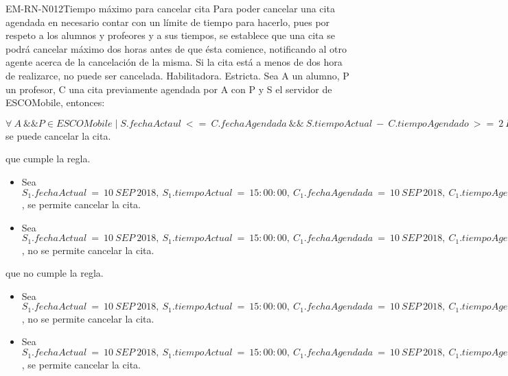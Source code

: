 \begin{BussinesRule}{EM-RN-N012}{Tiempo máximo para cancelar cita}
	\BRitem[Descripción:] Para poder cancelar una cita agendada en necesario contar con un límite de tiempo para hacerlo, pues por respeto a los alumnos y profeores y a sus tiempos, se establece que una cita se podrá cancelar máximo dos horas antes de que ésta comience, notificando al otro agente acerca de la cancelación de la misma. Si la cita está a menos de dos hora de realizarce, no puede ser cancelada.
	\BRitem[Tipo: ] Habilitadora.
	\BRitem[Nivel: ] Estricta.
	\BRitem[Sentenia: ] Sea A un alumno, P un profesor, C una cita previamente agendada por A con P y S el servidor de ESCOMobile, entonces:
	\begin{center}
		$\forall \: A \: \&\& P \in ESCOMobile \mid  S.fechaActaul \: <= \: C.fechaAgendada \: \&\& \: S.tiempoActual \: - \: C.tiempoAgendado \: >= \: 2 \: Horas \: \Rightarrow$ se puede cancelar la cita.
	\end{center}
	 que cumple la regla.
		\begin{itemize}
			\item Sea $S_{1}.fechaActual \: = \: 10 \: SEP \: 2018, \: S_{1}.tiempoActual \: = \: 15:00:00, \: C_{1}.fechaAgendada \: = \: 10 \: SEP \: 2018, \: C_{1}.tiempoAgendado \: = \: 12:00:00$, se permite
			cancelar la cita.
			\item Sea $S_{1}.fechaActual \: = \: 10 \: SEP \: 2018, \: S_{1}.tiempoActual \: = \: 15:00:00, \: C_{1}.fechaAgendada \: = \: 10 \: SEP \: 2018, \: C_{1}.tiempoAgendado \: = \: 14:00:00$, no se permite
			cancelar la cita.
		\end{itemize}
	 que no cumple la regla.
		\begin{itemize}
			\item Sea $S_{1}.fechaActual \: = \: 10 \: SEP \: 2018, \: S_{1}.tiempoActual \: = \: 15:00:00, \: C_{1}.fechaAgendada \: = \: 10 \: SEP \: 2018, \: C_{1}.tiempoAgendado \: = \: 12:00:00$, no se permite
			cancelar la cita.
			\item Sea $S_{1}.fechaActual \: = \: 10 \: SEP \: 2018, \: S_{1}.tiempoActual \: = \: 15:00:00, \: C_{1}.fechaAgendada \: = \: 10 \: SEP \: 2018, \: C_{1}.tiempoAgendado \: = \: 14:00:00$, se permite
			cancelar la cita.
		\end{itemize}

\end{BussinesRule}